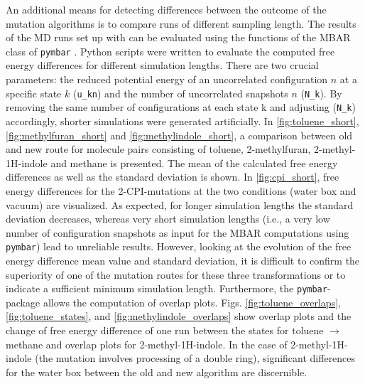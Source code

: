 An additional means for detecting differences between the outcome of the mutation algorithms is to compare runs of different sampling length. 
The results of the MD runs set up with {\trafo} can be evaluated using the functions of the MBAR class of \texttt{pymbar} \cite{Shirts.2008}. Python scripts were written to evaluate the computed free energy differences for different simulation lengths. There are two crucial parameters: the reduced potential energy of an uncorrelated configuration $n$ at a specific state $k$ (\texttt{u\_kn}) and the number of uncorrelated snapshots $n$ (\texttt{N\_k}). By removing the same number of configurations at each state k and adjusting (\texttt{N\_k}) accordingly, shorter simulations were generated artificially.
In \ref{fig:toluene_short}, \ref{fig:methylfuran_short} and \ref{fig:methylindole_short}, a comparison between old and new route for molecule pairs consisting of toluene, 2-methylfuran, 2-methyl-1H-indole and methane is presented. The mean of the calculated free energy differences as well as the standard deviation is shown. In \ref{fig:cpi_short}, free energy differences for the 2-CPI-mutations at the two conditions (water box and vacuum) are visualized. 
As expected, for longer simulation lengths the standard deviation decreases, whereas very short simulation lengths (i.e., a very low number of configuration snapshots as input for the MBAR computations using \texttt{pymbar}) lead to unreliable results. However, looking at the evolution of the free energy difference mean value and standard deviation, it is difficult to confirm the superiority of one of the mutation routes for these three transformations or to indicate a sufficient minimum simulation length.
Furthermore, the \texttt{pymbar}-package \cite{Shirts.2008} allows the computation of overlap plots. Figs. \ref{fig:toluene_overlaps}, \ref{fig:toluene_states}, and \ref{fig:methylindole_overlaps} show overlap plots and the change of free energy difference of one run between the states for toluene $\mathrm{\rightarrow}$ methane and overlap plots for 2-methyl-1H-indole. In the case of 2-methyl-1H-indole (the mutation involves processing of a double ring),  significant differences for the water box between the old and new algorithm are discernible.



